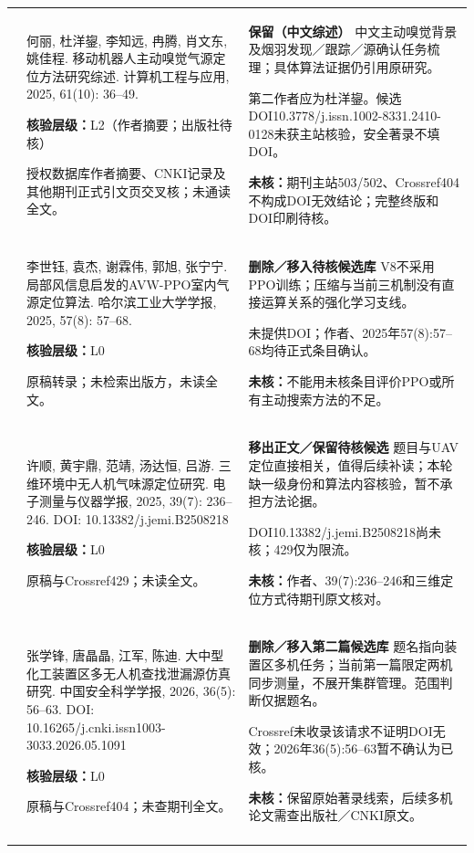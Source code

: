 \begin{longtable}{@{}>{\raggedright\arraybackslash}p{0.7cm}>{\raggedright\arraybackslash}p{7.0cm}>{\raggedright\arraybackslash}p{7.8cm}@{}}
17 & 何丽, 杜洋鋆, 李知远, 冉腾, 肖文东, 姚佳程. 移动机器人主动嗅觉气源定位方法研究综述. 计算机工程与应用, 2025, 61(10): 36–49.\par\textbf{核验层级：}L2（作者摘要；出版社待核）\par 授权数据库作者摘要、CNKI记录及其他期刊正式引文页交叉核；未通读全文。 & \textbf{保留（中文综述）} 中文主动嗅觉背景及烟羽发现／跟踪／源确认任务梳理；具体算法证据仍引用原研究。\par 第二作者应为杜洋鋆。候选DOI10.3778/j.issn.1002-8331.2410-0128未获主站核验，安全著录不填DOI。\par\textbf{未核：}期刊主站503/502、Crossref404不构成DOI无效结论；完整终版和DOI印刷待核。 \\\addlinespace[6pt]
18 & 李世钰, 袁杰, 谢霖伟, 郭旭, 张宁宁. 局部风信息启发的AVW-PPO室内气源定位算法. 哈尔滨工业大学学报, 2025, 57(8): 57–68.\par\textbf{核验层级：}L0\par 原稿转录；未检索出版方，未读全文。 & \textbf{删除／移入待核候选库} V8不采用PPO训练；压缩与当前三机制没有直接运算关系的强化学习支线。\par 未提供DOI；作者、2025年57(8):57–68均待正式条目确认。\par\textbf{未核：}不能用未核条目评价PPO或所有主动搜索方法的不足。 \\\addlinespace[6pt]
19 & 许顺, 黄宇鼎, 范靖, 汤达恒, 吕游. 三维环境中无人机气味源定位研究. 电子测量与仪器学报, 2025, 39(7): 236–246. DOI: 10.13382/j.jemi.B2508218\par\textbf{核验层级：}L0\par 原稿与Crossref429；未读全文。 & \textbf{移出正文／保留待核候选} 题目与UAV定位直接相关，值得后续补读；本轮缺一级身份和算法内容核验，暂不承担方法论据。\par DOI10.13382/j.jemi.B2508218尚未核；429仅为限流。\par\textbf{未核：}作者、39(7):236–246和三维定位方式待期刊原文核对。 \\\addlinespace[6pt]
20 & 张学锋, 唐晶晶, 江军, 陈迪. 大中型化工装置区多无人机查找泄漏源仿真研究. 中国安全科学学报, 2026, 36(5): 56–63. DOI: 10.16265/j.cnki.issn1003-3033.2026.05.1091\par\textbf{核验层级：}L0\par 原稿与Crossref404；未查期刊全文。 & \textbf{删除／移入第二篇候选库} 题名指向装置区多机任务；当前第一篇限定两机同步测量，不展开集群管理。范围判断仅据题名。\par Crossref未收录该请求不证明DOI无效；2026年36(5):56–63暂不确认为已核。\par\textbf{未核：}保留原始著录线索，后续多机论文需查出版社／CNKI原文。 \\\addlinespace[6pt]

\end{longtable}
